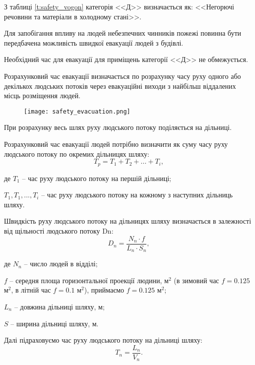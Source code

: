 \par З таблиці \ref{t:safety_vogon} категорія <<Д>> визначається як: <<Негорючі речовини та матеріали в холодному стані>>.

\par Для запобігання впливу на людей небезпечних чинників пожежі повинна бути передбачена можливість швидкої евакуації людей з будівлі.
\par Необхідний час для евакуації для приміщень категорії <<Д>> не обмежується.
\par Розрахунковий час евакуації визначається по розрахунку часу руху одного або декількох людських потоків через евакуаційні виходи з найбільш віддалених місць розміщення людей.

\begin{figure}[!ht]
\centering
		\texttt{[image: safety\_evacuation.png]}
		\label{pic:safety_evacuation}
\end{figure}

\par При розрахунку весь шлях руху людського потоку поділяється на дільниці.
\par Розрахунковий час евакуації людей потрібно визначити як суму часу руху людського потоку по окремих дільницях шляху:
	\begin{equation}
		T_{p}=T_{1}+T_{2}+ ... + T_{i},
	\end{equation}
\par де $T_{1}$ -- час руху людського потоку на першій дільниці;
\par $T_{1}, T_{1}, ..., T_{i}$ -- час руху людського потоку на кожному з наступних дільниць шляху.

\par Швидкість руху людського потоку на дільницях шляху визначається в залежності від щільності людського потоку Dn:
	\begin{equation}
		D_{n}=\frac{N_{n}\cdot f}{L_{n}\cdot S_{n}},
	\end{equation}
\par де $N_{n}$ -- число людей в відділі;
\par $f$ -- середня площа горизонтальної проекції людини, м$^2$ (в зимовий час $f = 0.125$ м$^2$, в літній час $f = 0.1$ м$^2$), приймаємо $f = 0.125$ м$^2$;
\par $L_{n}$ -- довжина дільниці шляху, м;
\par $S$ -- ширина дільниці шляху, м.

\par Далі підраховуємо час руху людського потоку на дільниці шляху:
	\begin{equation}
		T_{n}=\frac{L_{n}}{V_{n}}.
	\end{equation}

